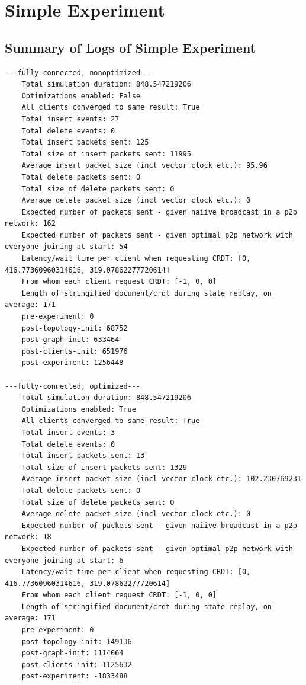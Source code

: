 \documentclass[12pt,a4paper,twoside,openright]{report}
\begin{document}
\chapter{Simple Experiment}

\section{Summary of Logs of Simple Experiment}
\label{appendix:simplelogsummary}

\begin{verbatim}
---fully-connected, nonoptimized---
	Total simulation duration: 848.547219206
	Optimizations enabled: False
	All clients converged to same result: True
	Total insert events: 27
	Total delete events: 0
	Total insert packets sent: 125
	Total size of insert packets sent: 11995
	Average insert packet size (incl vector clock etc.): 95.96
	Total delete packets sent: 0
	Total size of delete packets sent: 0
	Average delete packet size (incl vector clock etc.): 0
	Expected number of packets sent - given naiive broadcast in a p2p network: 162
	Expected number of packets sent - given optimal p2p network with everyone joining at start: 54
	Latency/wait time per client when requesting CRDT: [0, 416.77360960314616, 319.07862277720614]
	From whom each client request CRDT: [-1, 0, 0]
	Length of stringified document/crdt during state replay, on average: 171
	pre-experiment: 0
	post-topology-init: 68752
	post-graph-init: 633464
	post-clients-init: 651976
	post-experiment: 1256448

---fully-connected, optimized---
	Total simulation duration: 848.547219206
	Optimizations enabled: True
	All clients converged to same result: True
	Total insert events: 3
	Total delete events: 0
	Total insert packets sent: 13
	Total size of insert packets sent: 1329
	Average insert packet size (incl vector clock etc.): 102.230769231
	Total delete packets sent: 0
	Total size of delete packets sent: 0
	Average delete packet size (incl vector clock etc.): 0
	Expected number of packets sent - given naiive broadcast in a p2p network: 18
	Expected number of packets sent - given optimal p2p network with everyone joining at start: 6
	Latency/wait time per client when requesting CRDT: [0, 416.77360960314616, 319.07862277720614]
	From whom each client request CRDT: [-1, 0, 0]
	Length of stringified document/crdt during state replay, on average: 171
	pre-experiment: 0
	post-topology-init: 149136
	post-graph-init: 1114064
	post-clients-init: 1125632
	post-experiment: -1833488


\end{verbatim}
\end{document}
